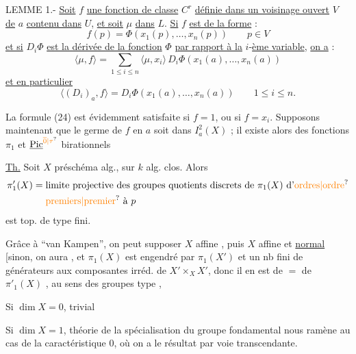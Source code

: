 LEMME 1.- \uline{Soit} $f$ \uline{une fonction de classe} $C^r$ \uline{définie dans un voisinage ouvert} $V$ \uline{de} $a$ \uline{contenu dans} $U$, \uline{et soit} $\mu$ \uline{dans} $L$. \uline{Si} $f$ \uline{est de la forme} :
\[
f(p)=\Phi(x_1(p),\ldots,x_n(p))\qquad p\in V\tag*{(23)}
\]
\uline{et si} $D_i\Phi$ \uline{est la dérivée de la fonction} $\Phi$ \uline{par rapport à la} $i$-\uline{ème variable}, \uline{on a} :
\[
\langle\mu,f\rangle=\sum_{1\leq i\leq n}\langle\mu,x_i\rangle\,D_i\Phi(x_1(a),\ldots,x_n(a))\tag*{(24)}
\]
\uline{et en particulier}
\[
\langle(D_i)_a,f\rangle=D_i\Phi(x_1(a),\ldots,x_n(a))\qquad 1\leq i\leq n.\tag*{(25)}
\]

La formule (24) est évidemment satisfaite si $f=1$, ou si $f=x_i$. Supposons maintenant que le germe de $f$ en $a$ soit dans $I_a^2(X)$ ; il existe alors des fonctions
$\pi_1$ et $\underline{\operatorname{Pic}}^{\unsure{\overline{0}|\tau}}$ birationnels

\uline{Th.} Soit $X$ préschéma alg., sur $k$ alg. clos. Alors
\[
\begin{aligned}
\pi'_1(X)={}&\text{limite projective des groupes quotients discrets de }\pi_1(X)\text{ d'\unsure{ordres|ordre}}\\
&\text{\unsure{premiers|premier} à }p
\end{aligned}
\]
est top. de type fini.

Grâce à ``van Kampen'', on peut supposer $X$ affine , puis $X$ affine et \uline{normal} [sinon, on aura
, et $\pi_1(X)$ est engendré par $\pi_1(X')$ et un nb fini de générateurs  aux composantes irréd. de $X'\times_X X'$, donc il en est de $=$ de $\pi'_1(X)$ , au  sens des groupes  type , 

Si $\dim X=0$, trivial

Si $\dim X=1$, théorie de la spécialisation du groupe fondamental  nous ramène au cas de la caractéristique $0$, où on a  le  résultat par voie transcendante.

